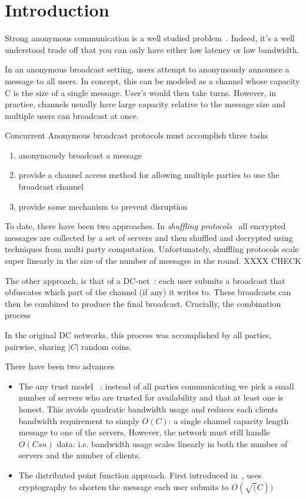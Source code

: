 
\section{Introduction}
Strong anonymous communication is a well studied problem~\cite{}. Indeed, it's a well understood trade off that you can only have either low latency or low bandwidth.

In an anonymous broadcast setting, users attempt to anonymously announce a message to all users. In concept, this can be modeled as a channel whose capacity C is the size of a single message. User's would then take turns. However, in practice, channels usually have large capacity relative to the message size and multiple users can broadcast at once.

Concurrent Anonymous broadcast protocols must accomplish three tasks
\begin{enumerate}
	\item anonymously broadcast a message
	\item provide a channel access method for allowing multiple parties to use the broadcast channel
	\item provide some mechanism to prevent disruption
\end{enumerate}

To date, there have been two approaches. In \emph{shuffling protocols}~\cite{CCS:LYKGKM19,USENIX:AKTZ17} all encrypted messages are collected by a set of servers and then shuffled and decrypted using techniques from multi party computation. Unfortunately, shuffling protocols scale super linearly in the size of the number of messages in the round.  XXXX CHECK

The other approach, is that of a DC-net~\cite{JC:Chaum88}: each user submits a broadcast that obfuscates which part of the channel (if any) it writes to.  These broadcasts can then be combined to produce the final broadcast. Crucially, the combination process

In the original DC networks, this process was accomplished  by all parties, pairwise, sharing $|C|$ random coins.

There have been two advances
\begin{itemize}
	\item The any trust model ~\cite{CCS:CorFor10}: instead of all parties communicating we pick a small number of servers who are trusted for availability and that at least one is honest. This avoids quadratic bandwidth usage and reduces each clients bandwidth requirement to simply $O(C)$: a single channel capacity length message to one of the servers. However, the network must still handle $O(Csn)$ data: i.e. bandwidth usage scales linearly in both the number of servers and the number of clients.
	\item The distributed point function approach. First introduced in~\cite{SP:CorBonMaz15}, uses cryptography to shorten the message each user submits to $O(\sqrt(C))$
\end{itemize}


